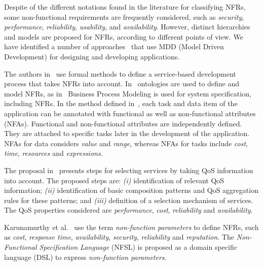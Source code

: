 Despite of the different notations found in the literature for classifying NFRs, some non-functional requirements are frequently considered, such as \textit{security}, \textit{performance}, \textit{reliability}, \textit{usability}, and \textit{availability}.
However, distinct hierarchies and models are proposed for NFRs,  according to different points of view.
We have identified a number of approaches~\cite{DAmbrogio06,CholletL09,SchmelingCM11,BasinDL06,Fabra2011,OvaskaEHPA10} that use MDD (Model Driven Development) for designing and developing applications. 

The authors in~\cite{ThissenW06,ZhangPSP05} use formal methods to define a service-based development process that takes NFRs into account. 
In~\cite{AgarwalLS09,PastranaPK11} ontologies are used to define and model NFRs, 
as  in~\cite{XiaoCZBOLH08,GutierrezRF10} Business Process Modeling is used for
system specification, including NFRs. 
In the method defined in~\cite{XiaoCZBOLH08}, each task and data item of the application can be 
annotated with functional as well as non-functional attributes (NFAs). 
Functional and non-functional at\-tri\-butes are independently defined.
They are attached to specific tasks later in the development of the application. 
NFAs for data considers \textit{value} and \textit{range}, whereas NFAs for tasks include \textit{cost}, \textit{time}, \textit{resources} and \textit{expressions}.

The proposal in~\cite{ThissenW06} presents steps for  selecting services 
by taking QoS information into account. The proposed steps are: 
\textit{(i)} identification of relevant QoS information; 
\textit{(ii)} identification of basic composition patterns and 
QoS aggregation rules for these patterns; and 
\textit{(iii)} definition of a selection mechanism of services. 
The QoS properties considered are \textit{performance}, \textit{cost}, \textit{reliability} and
\textit{availability}. 
  
Karunamurthy et al.~\cite{Karunamurthy2012787} use the term \textit{non-function parameters} to define NFRs, such as \textit{cost}, \textit{response time}, \textit{availability}, \textit{security}, \textit{reliability} and \textit{reputation}.  
The \textit{Non-Func\-tion\-al Specification Language} (NFSL) is proposed as a domain specific language (DSL) to express \textit{non-function parameters}.

